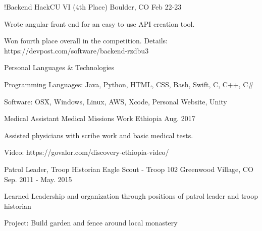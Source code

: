 \vspace{-2.0mm}

\begin{cventries}
\cventry
    {!Backend} %
    {HackCU VI (4th Place)} %
    {Boulder, CO} %
    {Feb 22-23} %
    {
    \begin{cvitems} %
        \item {Wrote angular front end for an easy to use API creation tool.}
        \item {Won fourth place overall in the competition. Details: https://devpost.com/software/backend-rzdbu3}
        \end{cvitems}
    }

  \cventry
    {Personal} %
    {Languages \& Technologies} %
    {} %
    {} %
    {
      \begin{cvitems} %
        \item {Programming Languages: Java, Python, HTML, CSS, Bash, Swift, C, C++, C\#}
        \item {Software: OSX, Windows, Linux, AWS, Xcode, Personal Website, Unity}
      \end{cvitems}
    }

\cventry
    {Medical Assistant} %
    {Medical Missions Work} %
    {Ethiopia} %
    {Aug. 2017} %
    {
      \begin{cvitems} %
        \item {Assisted physicians with scribe work and basic medical tests.}
        \item {Video: https://govalor.com/discovery-ethiopia-video/}
      \end{cvitems}
    }
\cventry
    {Patrol Leader, Troop Historian} %
    {Eagle Scout - Troop 102} %
    {Greenwood Village, CO} %
    {Sep. 2011 - May. 2015} %
    {
    \begin{cvitems} %
        \item {Learned Leadership and organization through positions of patrol leader and troop historian}
        \item {Project: Build garden and fence around local monastery }
    \end{cvitems}
    }

\end{cventries}
